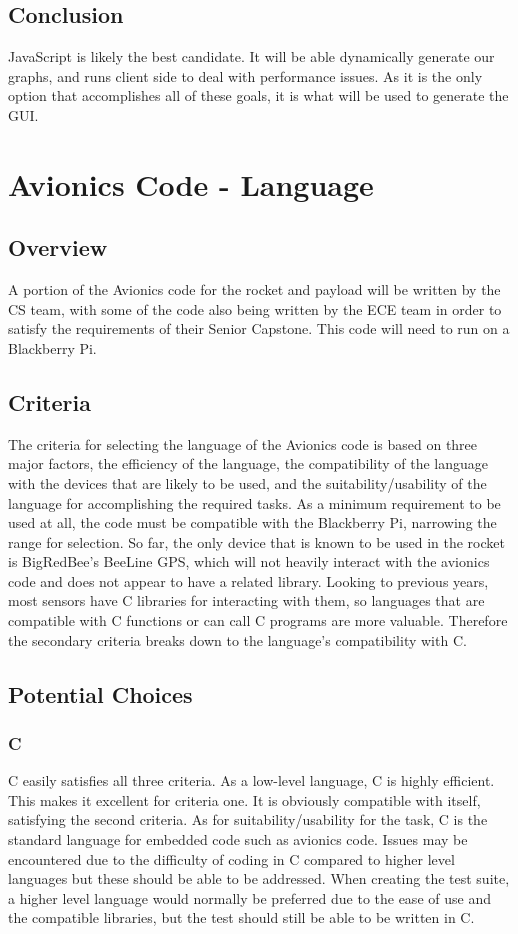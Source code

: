 \documentclass[onecolumn, draftclsnofoot,10pt, compsoc]{IEEEtran}
\begin{document}
\subsection{Conclusion}
JavaScript is likely the best candidate. It will be able dynamically generate our graphs, and runs client side to deal with performance issues. As it is the only option that accomplishes all of these goals, it is what will be used to generate the GUI.

\section{Avionics Code - Language}
\subsection{Overview}
A portion of the Avionics code for the rocket and payload will be written by the CS team, with some of the code also being written by the ECE team in order to satisfy the requirements of their Senior Capstone. This code will need to run on a Blackberry Pi.
\subsection{Criteria}
The criteria for selecting the language of the Avionics code is based on three major factors, the efficiency of the language, the compatibility of the language with the devices that are likely to be used, and the suitability/usability of the language for accomplishing the required tasks. As a minimum requirement to be used at all, the code must be compatible with the Blackberry Pi, narrowing the range for selection. So far, the only device that is known to be used in the rocket is BigRedBee's BeeLine GPS\cite{site4}, which will not heavily interact with the avionics code and does not appear to have a related library. Looking to previous years, most sensors have C libraries for interacting with them, so languages that are compatible with C functions or can call C programs are more valuable. Therefore the secondary criteria breaks down to the language's compatibility with C.

\subsection{Potential Choices}
\subsubsection{C}
C easily satisfies all three criteria. As a low-level language, C is highly efficient. This makes it excellent for criteria one. It is obviously compatible with itself, satisfying the second criteria. As for suitability/usability for the task, C is the standard language for embedded code such as avionics code. Issues may be encountered due to the difficulty of coding in C compared to higher level languages but these should be able to be addressed. When creating the test suite, a higher level language would normally be preferred due to the ease of use and the compatible libraries, but the test should still be able to be written in C.
\end{document}

